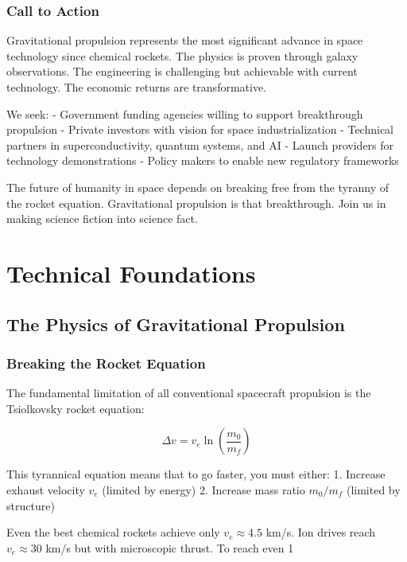 \documentclass[12pt,letterpaper]{book}
\theoremstyle{definition}
\theoremstyle{plain}
\theoremstyle{remark}
\begin{document}
{{{{{\section{Call to Action}

Gravitational propulsion represents the most significant advance in space technology since chemical rockets. The physics is proven through galaxy observations. The engineering is challenging but achievable with current technology. The economic returns are transformative.

We seek:
- Government funding agencies willing to support breakthrough propulsion
- Private investors with vision for space industrialization  
- Technical partners in superconductivity, quantum systems, and AI
- Launch providers for technology demonstrations
- Policy makers to enable new regulatory frameworks

The future of humanity in space depends on breaking free from the tyranny of the rocket equation. Gravitational propulsion is that breakthrough. Join us in making science fiction into science fact.

\mainmatter

\part{Technical Foundations}

\chapter{The Physics of Gravitational Propulsion}

\section{Breaking the Rocket Equation}

The fundamental limitation of all conventional spacecraft propulsion is the Tsiolkovsky rocket equation:

\begin{equation}
\Delta v = v_e \ln\left(\frac{m_0}{m_f}\right)
\end{equation}

This tyrannical equation means that to go faster, you must either:
1. Increase exhaust velocity $v_e$ (limited by energy)
2. Increase mass ratio $m_0/m_f$ (limited by structure)

Even the best chemical rockets achieve only $v_e \approx 4.5$ km/s. Ion drives reach $v_e \approx 30$ km/s but with microscopic thrust. To reach even 1%

}}}}}
\end{document}
